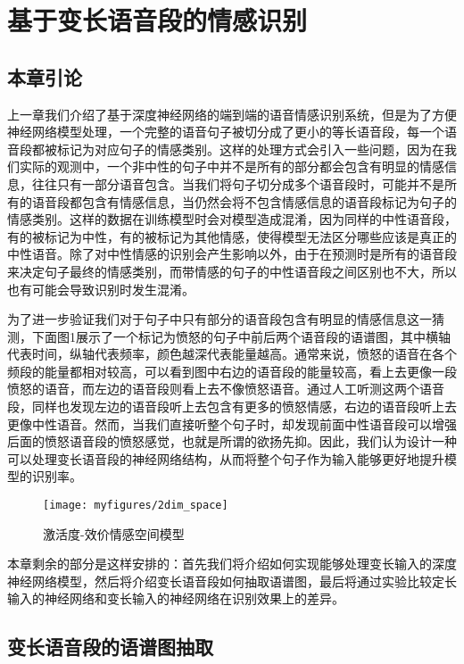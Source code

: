 \chapter{基于变长语音段的情感识别}
\label{cha:var_len}

\section{本章引论}
\label{sec:var_len_intro}

上一章我们介绍了基于深度神经网络的端到端的语音情感识别系统，但是为了方便神经网络模型处理，一个完整的语音句子被切分成了更小的等长语音段，每一个语音段都被标记为对应句子的情感类别。这样的处理方式会引入一些问题，因为在我们实际的观测中，一个非中性的句子中并不是所有的部分都会包含有明显的情感信息，往往只有一部分语音包含。当我们将句子切分成多个语音段时，可能并不是所有的语音段都包含有情感信息，当仍然会将不包含情感信息的语音段标记为句子的情感类别。这样的数据在训练模型时会对模型造成混淆，因为同样的中性语音段，有的被标记为中性，有的被标记为其他情感，使得模型无法区分哪些应该是真正的中性语音。除了对中性情感的识别会产生影响以外，由于在预测时是所有的语音段来决定句子最终的情感类别，而带情感的句子的中性语音段之间区别也不大，所以也有可能会导致识别时发生混淆。

为了进一步验证我们对于句子中只有部分的语音段包含有明显的情感信息这一猜测，下面图1展示了一个标记为愤怒的句子中前后两个语音段的语谱图，其中横轴代表时间，纵轴代表频率，颜色越深代表能量越高。通常来说，愤怒的语音在各个频段的能量都相对较高，可以看到图中右边的语音段的能量较高，看上去更像一段愤怒的语音，而左边的语音段则看上去不像愤怒语音。通过人工听测这两个语音段，同样也发现左边的语音段听上去包含有更多的愤怒情感，右边的语音段听上去更像中性语音。然而，当我们直接听整个句子时，却发现前面中性语音段可以增强后面的愤怒语音段的愤怒感觉，也就是所谓的欲扬先抑。因此，我们认为设计一种可以处理变长语音段的神经网络结构，从而将整个句子作为输入能够更好地提升模型的识别率。

\begin{figure}[H] %
    \centering
    \texttt{[image: myfigures/2dim\_space]}
    \caption{激活度-效价情感空间模型}
    \label{fig:xfig1}
\end{figure}

本章剩余的部分是这样安排的：首先我们将介绍如何实现能够处理变长输入的深度神经网络模型，然后将介绍变长语音段如何抽取语谱图，最后将通过实验比较定长输入的神经网络和变长输入的神经网络在识别效果上的差异。

\section{变长语音段的语谱图抽取}

